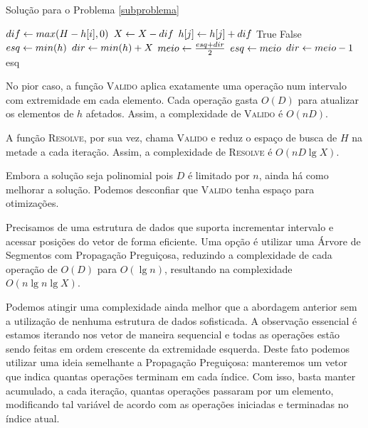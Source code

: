 \begin{algorithm}[H]
\caption{Solução para o Problema \ref{subproblema}}
\label{subproblema:code}
\begin{algorithmic}[1]
        \State $dif \leftarrow max(H - h[i], 0)$
        \State $X \leftarrow X - dif$
            \State $h[j] \leftarrow h[j] + dif$
        \EndFor
    \EndFor
        \State \Return True
    \Else
        \State \Return False
    \EndIf
\EndFunction
{}
    \State $esq \leftarrow min(h)$
    \State $dir \leftarrow min(h) + X$
        \State $meio \leftarrow \frac{esq + dir}{2}$
            \State $esq \leftarrow meio$
        \Else
            \State $dir \leftarrow meio - 1$
        \EndIf
    \EndWhile
    \State \Return esq
\EndFunction
\end{algorithmic}
\end{algorithm}

No pior caso, a função \textsc{Valido} aplica exatamente uma operação num intervalo com extremidade em cada elemento. Cada operação gasta $O(D)$ para atualizar os elementos de $h$ afetados. Assim, a complexidade de \textsc{Valido} é $O(nD)$.

A função \textsc{Resolve}, por sua vez, chama \textsc{Valido} e reduz o espaço de busca de $H$ na metade a cada iteração. Assim, a complexidade de \textsc{Resolve} é $O(nD \lg X)$.

Embora a solução seja polinomial pois $D$ é limitado por $n$, ainda há como melhorar a solução. Podemos desconfiar que \textsc{Valido} tenha espaço para otimizações. 

Precisamos de uma estrutura de dados que suporta incrementar intervalo e acessar posições do vetor de forma eficiente. Uma opção é utilizar uma Árvore de Segmentos com Propagação Preguiçosa, reduzindo a complexidade de cada operação de $O(D)$ para $O(\lg n)$, resultando na complexidade $O(n \lg n \lg X)$.

Podemos atingir uma complexidade ainda melhor que a abordagem anterior sem a utilização de nenhuma estrutura de dados sofisticada. A observação essencial é estamos iterando nos vetor de maneira sequencial e todas as operações estão sendo feitas em ordem crescente da extremidade esquerda. Deste fato podemos utilizar uma ideia semelhante a Propagação Preguiçosa: manteremos um vetor que indica quantas operações terminam em cada índice. Com isso, basta manter acumulado, a cada iteração, quantas operações passaram por um elemento, modificando tal variável de acordo com as operações iniciadas e terminadas no índice atual.

